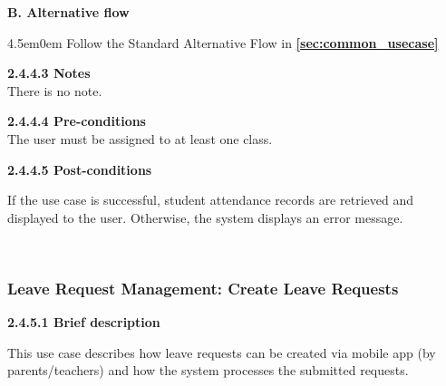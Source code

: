 \par\indent\indent\textbf{B. Alternative flow}
\begin{adjustwidth}{4.5em}{0em}
    Follow the Standard Alternative Flow in \textbf{\autoref{sec:common_usecase} }
\end{adjustwidth}

\vspace{0.5em}
\indent\textbf{2.4.4.3 Notes}\\
\indent\indent There is no note.
\vspace{0.5em}

\indent\textbf{2.4.4.4 Pre-conditions}\\
\indent\indent The user must be assigned to at least one class.
\vspace{0.5em}

\indent\textbf{2.4.4.5 Post-conditions}\\
\vspace{-0.7em}
\par\indent\indent\parbox{0.9\textwidth}{
    If the use case is successful, student attendance records are retrieved and displayed to the user. Otherwise, the system displays an error message.
}\\
\subsubsection{Leave Request Management: Create Leave Requests}
\indent\indent\textbf{2.4.5.1 Brief description}
\vspace{0.5em}
\par\indent\indent\parbox{0.9\textwidth}{
    This use case describes how leave requests can be created via mobile app (by parents/teachers) and how the system processes the submitted requests.
}\\

